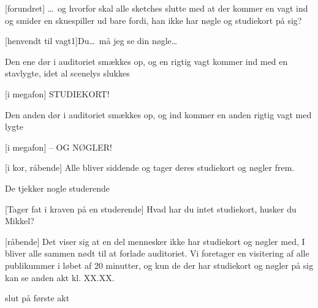 \documentclass[10pt]{article}
\begin{document}
\begin{sketch}
 [forundret] \ldots\ og hvorfor skal alle sketches slutte med at der kommer en vagt ind og smider en skuespiller ud bare fordi,
han ikke har nøgle og studiekort på sig?


 [henvendt til vagt1]Du\ldots\ må jeg se din nøgle\ldots

\scene Den ene dør i auditoriet smækkes op, og en rigtig vagt kommer ind
med en stavlygte, idet al scenelys slukkes

[i megafon] STUDIEKORT!

\scene Den anden dør i auditoriet smækkes op, og ind kommer en anden rigtig
vagt med lygte

[i megafon] -- OG NØGLER!

[i kor, råbende] Alle bliver siddende og tager deres
studiekort og nøgler frem.

\scene De tjekker nogle studerende

[Tager fat i kraven på en studerende] Hvad har du intet
studiekort, husker du Mikkel?

[råbende] Det viser sig at en del mennesker ikke har studiekort
og nøgler med, I bliver alle sammen nødt til at forlade auditoriet. Vi
foretager en visitering af alle publikummer i løbet af 20 minutter,
og kun de der har studiekort og nøgler på sig kan se anden akt kl. XX.XX.

\scene slut på første akt
\end{sketch}
\end{document}

